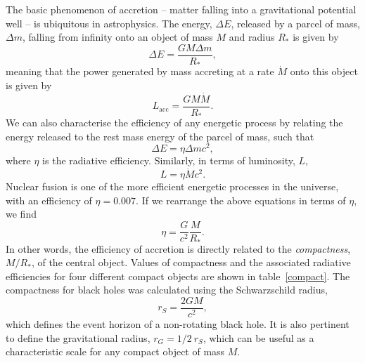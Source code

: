 The basic phenomenon of accretion -- 
matter falling into a gravitational potential well -- 
is ubiquitous in astrophysics. The energy, $\Delta E$, released by a parcel of 
mass, $\Delta m$, falling from infinity onto an object of mass $M$ and radius $R_*$
is given by
\begin{equation}
\Delta E = \frac{GM \Delta m}{R_*},
\label{eq:acc_energy}
\end{equation} 
meaning that the power generated by mass accreting at a rate $\dot{M}$ onto this
object is given by 
\begin{equation}
L_{\mathrm{acc}} = \frac{GM \dot{M}}{R_*}.
\label{eq:acc_energy}
\end{equation} 
We can also characterise the efficiency of any energetic process by relating
the energy released to the rest mass energy of the parcel of mass, such that
\begin{equation}
\Delta E = \eta \Delta m c^2,
\label{eq:restmass}
\end{equation} 
where $\eta$ is the radiative efficiency. Similarly, in terms of luminosity, $L$,
\begin{equation}
L = \eta \dot{M} c^2.
\label{eq:restmass2}
\end{equation} 
Nuclear fusion  is one of the more efficient
energetic processes in the universe, with an efficiency of
$\eta=0.007$. If we rearrange the above equations in terms of $\eta$, we find
\begin{equation}
\eta = \frac{G}{c^2} \frac{M}{R_*}.
\label{eq:eta}
\end{equation} 
In other words, the efficiency of accretion is directly related 
to the {\em compactness}, $M/R_*$, of the central object. 
Values of compactness and the associated radiative efficiencies 
for four different compact objects are shown in table~\ref{compact}. 
The compactness for black holes was calculated using the Schwarzschild radius,
\begin{equation}
r_S = \frac{2GM}{c^2},
\label{eq:eta}
\end{equation}
which defines the event horizon of a non-rotating black hole. It is also pertinent
to define the gravitational radius, $r_G = 1/2~r_S$, which can be useful as
a characteristic scale for any compact object of mass $M$. 

